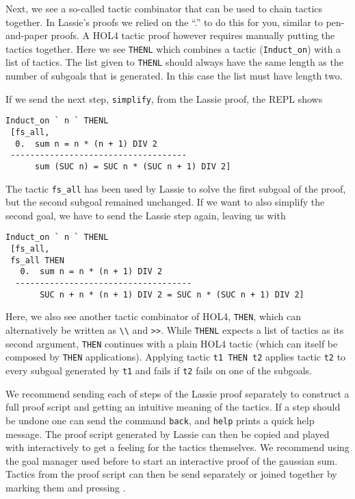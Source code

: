Next, we see a so-called tactic combinator that can be used to chain tactics
together.
In Lassie's proofs we relied on the ``.'' to do this for you, similar to
pen-and-paper proofs.
A HOL4 tactic proof however requires manually putting the tactics together.
Here we see \lstinline{THENL} which combines a tactic (\lstinline{Induct_on})
with a list of tactics.
The list given to \lstinline{THENL} should always have the same length as the number
of subgoals that is generated.
In this case the list must have length two.

If we send the next step, \lstinline{simplify}, from the Lassie proof, the REPL shows
%
\begin{lstlisting}[frame=single]
Induct_on ` n ` THENL
 [fs_all,
  0.  sum n = n * (n + 1) DIV 2
 ------------------------------------
      sum (SUC n) = SUC n * (SUC n + 1) DIV 2]
\end{lstlisting}

The tactic \lstinline{fs_all} has been used by Lassie to solve the first subgoal
of the proof, but the second subgoal remained unchanged.
If we want to also simplify the second goal, we have to send the Lassie step again,
leaving us with
%
\begin{lstlisting}[frame=single]
Induct_on ` n ` THENL
 [fs_all,
 fs_all THEN
   0.  sum n = n * (n + 1) DIV 2
  ------------------------------------
       SUC n + n * (n + 1) DIV 2 = SUC n * (SUC n + 1) DIV 2]
\end{lstlisting}

Here, we also see another tactic combinator of HOL4, \lstinline{THEN}, which can
alternatively be written as \lstinline{\\} and \lstinline{>>}.
While \lstinline{THENL} expects a list of tactics as its second argument, \lstinline{THEN}
continues with a plain HOL4 tactic (which can itself be composed by
\lstinline{THEN} applications).
Applying tactic \lstinline{t1 THEN t2} applies tactic \lstinline{t2} to every
subgoal  generated by \lstinline{t1} and fails if \lstinline{t2} fails on one of
the subgoals.

We recommend sending each of steps of the Lassie proof separately to construct a
full proof script and getting an intuitive meaning of the tactics.
If a step should be undone one can send the command \lstinline{back}, and
\lstinline{help} prints a quick help message.
The proof script generated by Lassie can then be copied and played with
interactively to get a feeling for the tactics themselves.
We recommend using the goal manager used before to start an interactive proof of
the gaussian sum.
Tactics from the proof script can then be send separately or joined together by
marking them and pressing .